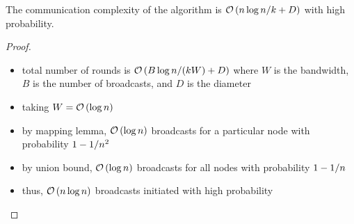 \begin{frame}
    \begin{lemma}
        The communication complexity of the algorithm is $\mathcal{O}\left(n\log n/k + D\right)$
        with high probability.
    \end{lemma}
    \begin{proof}
        \begin{itemize}
            \item total number of rounds is $\mathcal{O}\left(B\log{n} / (kW) + D\right)$ where $W$ is the bandwidth, $B$ is the number of broadcasts, and $D$ is the
            diameter
            \item taking $W = \mathcal{O}\left(\log{n}\right)$
            \item by mapping lemma, $\mathcal{O}\left(\log{n}\right)$ broadcasts for a particular
                  node with probability $1 - 1 / n^2$
            \item by union bound, $\mathcal{O}\left(\log{n}\right)$ broadcasts for all nodes with
                  probability $1 - 1 / n$
            \item thus, $\mathcal{O}\left(n\log{n}\right)$ broadcasts initiated with high probability
        \end{itemize}
    \end{proof}
\end{frame}